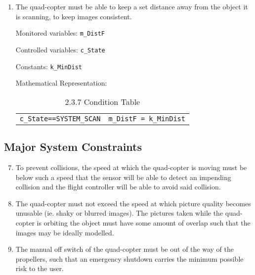 \documentclass[10pt,letterpaper]{article}
\begin{document}
\begin{enumerate}[label=\textbf{MC\arabic*}]
    \item The quad-copter must be able to keep a set distance away from the object it is scanning, to keep images consistent. \par 
    
    Monitored variables: \texttt{m\_DistF} \par
    Controlled variables: \texttt{c\_State} \par
    Constants: \texttt{k\_MinDist} \par
    Mathematical Representation:
    \begin{table}[H] 
    \begin{adjustwidth}{-1.2in}{-1.2in}  
    \begin{center}
    \begin{tabular}{c c}
	\hline
	\sc{Condition} & \sc{Outcome} \\
	\hline
	\texttt{c\_State==SYSTEM\_SCAN} & \texttt{m\_DistF = k\_MinDist}\\
	\end{tabular}
    \end{center}
    \caption[2.3.7 Condition Table]{2.3.7 Condition Table}
    \end{adjustwidth}
	\end{table} 
    
\end{enumerate}

\subsection{Major System Constraints} 
\begin{enumerate}[label=\textbf{MC\arabic*}]
    \setcounter{enumi}{6}
	\item To prevent collisions, the speed at which the quad-copter is moving must be below such a speed that the sensor will be able to detect an impending collision and the flight controller will be able to avoid said collision.
    \item The quad-copter must not exceed the speed at which picture quality becomes unusable (ie. shaky or blurred images). The pictures taken while the quad-copter is orbiting the object must have some amount of overlap such that the images may be ideally modelled.
    \item The manual off switch of the quad-copter must be out of the way of the propellers, such that an emergency shutdown carries the minimum possible risk to the user.
\end{enumerate}
\end{document}
